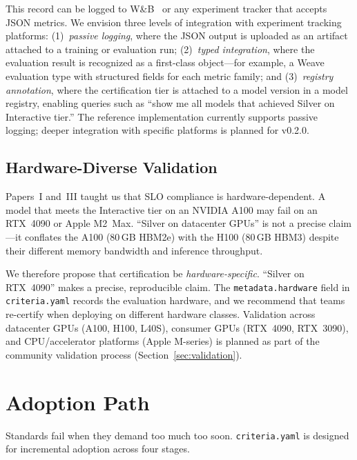 \documentclass[11pt]{article}
\newcommand{\criteriayaml}{\texttt{criteria.yaml}}
\begin{document}
This record can be logged to W\&B~\citep{wandb2020} or any experiment tracker that accepts JSON metrics. We envision three levels of integration with experiment tracking platforms: (1)~\emph{passive logging}, where the JSON output is uploaded as an artifact attached to a training or evaluation run; (2)~\emph{typed integration}, where the evaluation result is recognized as a first-class object---for example, a Weave~\citep{weave2024} evaluation type with structured fields for each metric family; and (3)~\emph{registry annotation}, where the certification tier is attached to a model version in a model registry, enabling queries such as ``show me all models that achieved Silver on Interactive tier.'' The reference implementation currently supports passive logging; deeper integration with specific platforms is planned for v0.2.0.

\subsection{Hardware-Diverse Validation}

Papers~I and~III taught us that SLO compliance is hardware-dependent. A model that meets the Interactive tier on an NVIDIA A100 may fail on an RTX~4090 or Apple M2~Max. ``Silver on datacenter GPUs'' is not a precise claim---it conflates the A100 (80\,GB HBM2e) with the H100 (80\,GB HBM3) despite their different memory bandwidth and inference throughput.

We therefore propose that certification be \emph{hardware-specific}. ``Silver on RTX~4090'' makes a precise, reproducible claim. The \texttt{metadata.hardware} field in \criteriayaml{} records the evaluation hardware, and we recommend that teams re-certify when deploying on different hardware classes. Validation across datacenter GPUs (A100, H100, L40S), consumer GPUs (RTX~4090, RTX~3090), and CPU/accelerator platforms (Apple M-series) is planned as part of the community validation process (Section~\ref{sec:validation}).


\section{Adoption Path}
\label{sec:adoption}

Standards fail when they demand too much too soon. \criteriayaml{} is designed for incremental adoption across four stages.
\end{document}
